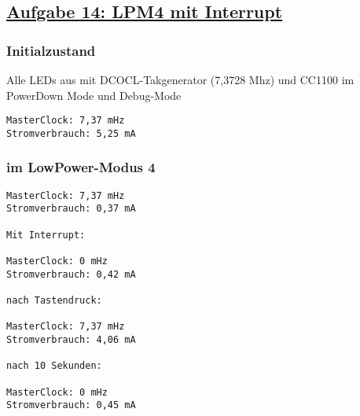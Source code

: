 \subsection*
{\href{http://cst.mi.fu-berlin.de/intern/19606-P-MPP/Aufgaben/040501.html}
{Aufgabe 14: LPM4 mit Interrupt}}

\subsubsection{Initialzustand}
Alle LEDs aus mit DCOCL-Takgenerator (7,3728 Mhz) und CC1100 im PowerDown Mode und Debug-Mode

\begin{verbatim}
MasterClock: 7,37 mHz
Stromverbrauch: 5,25 mA
\end{verbatim}

\subsubsection{im LowPower-Modus 4}
\begin{verbatim}
MasterClock: 7,37 mHz
Stromverbrauch: 0,37 mA

Mit Interrupt:

MasterClock: 0 mHz
Stromverbrauch: 0,42 mA

nach Tastendruck:

MasterClock: 7,37 mHz
Stromverbrauch: 4,06 mA

nach 10 Sekunden:

MasterClock: 0 mHz
Stromverbrauch: 0,45 mA
\end{verbatim}
